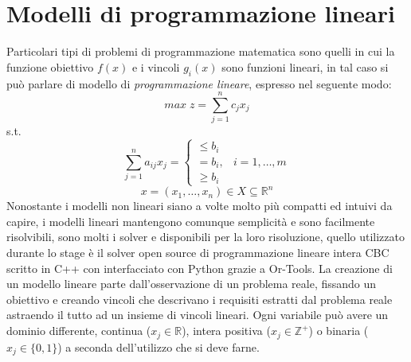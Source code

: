 \section{Modelli di programmazione lineari}
Particolari tipi di problemi di programmazione matematica sono quelli in cui la funzione obiettivo $f(x)$ e i vincoli $g_i(x)$ sono funzioni lineari, in tal caso si può parlare di modello di \textit{programmazione lineare}, espresso nel seguente modo:
$$ max\; z = \sum_{j=1}^n c_j x_j $$
s.t.
$$\sum_{j=1}^n a_{ij} x_j = \begin{cases} \leq b_i \\ = b_i, & i = 1,\dots,m \\ \geq b_i \end{cases}$$
$$x = (x_1,\dots,x_n) \in X \subseteq \mathbb{R}^n$$
Nonostante i modelli non lineari siano a volte molto più compatti ed intuivi da capire, i modelli lineari mantengono comunque semplicità e sono facilmente risolvibili, sono molti i solver  e  disponibili per la loro risoluzione, quello utilizzato durante lo stage è il solver open source di programmazione lineare intera CBC scritto in C++ con interfacciato con Python grazie a Or-Tools. La creazione di un modello lineare parte dall'osservazione di un problema reale, fissando un obiettivo e creando vincoli che descrivano i requisiti estratti dal problema reale astraendo il tutto ad un insieme di vincoli lineari.
Ogni variabile può avere un dominio differente, continua ($x_j \in \mathbb{R}$), intera positiva ($x_j \in \mathbb{Z}^+$) o binaria ($x_j \in \{0,1\}$) a seconda dell'utilizzo che si deve farne.

